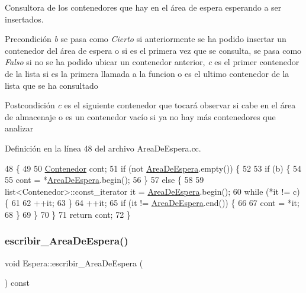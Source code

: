 Consultora de los contenedores que hay en el área de espera esperando a ser insertados. 

\begin{DoxyPrecond}{Precondición}
{\itshape b} se pasa como {\itshape Cierto} si anteriormente se ha podido insertar un contenedor del área de espera o si es el primera vez que se consulta, se pasa como {\itshape Falso} si no se ha podido ubicar un contenedor anterior, {\itshape c} es el primer contenedor de la lista si es la primera llamada a la funcion o es el ultimo contenedor de la lista que se ha consultado 
\end{DoxyPrecond}
\begin{DoxyPostcond}{Postcondición}
{\itshape c} es el siguiente contenedor que tocará observar si cabe en el área de almacenaje o es un contenedor vacío si ya no hay más contenedores que analizar 
\end{DoxyPostcond}


Definición en la línea 48 del archivo Area\+De\+Espera.\+cc.


\begin{DoxyCode}
48                                                                            \{
49     
50     \hyperlink{class_contenedor}{Contenedor} cont;
51     \textcolor{keywordflow}{if} (not \hyperlink{class_espera_adafca5e22c5bc21e517b363144fc6b18}{AreaDeEspera}.empty()) \{
52         
53         \textcolor{keywordflow}{if} (b) \{
54             
55             cont = *\hyperlink{class_espera_adafca5e22c5bc21e517b363144fc6b18}{AreaDeEspera}.begin();
56         \}
57         \textcolor{keywordflow}{else} \{
58             
59             list<Contenedor>::const\_iterator it = \hyperlink{class_espera_adafca5e22c5bc21e517b363144fc6b18}{AreaDeEspera}.begin();
60             \textcolor{keywordflow}{while} (*it != c) \{
61                 
62                 ++it;
63             \}
64             ++it;
65             \textcolor{keywordflow}{if} (it != \hyperlink{class_espera_adafca5e22c5bc21e517b363144fc6b18}{AreaDeEspera}.end()) \{
66                 
67                 cont = *it;
68             \}
69         \}
70     \}
71     \textcolor{keywordflow}{return} cont;
72 \}
\end{DoxyCode}
\mbox{\label{class_espera_aacb008e5be8ecd85fbba9cdef8b8be33}} 
\subsubsection{\texorpdfstring{escribir\+\_\+\+Area\+De\+Espera()}{escribir\_AreaDeEspera()}}
{\footnotesize\ttfamily void Espera\+::escribir\+\_\+\+Area\+De\+Espera (\begin{DoxyParamCaption}{ }\end{DoxyParamCaption}) const}



